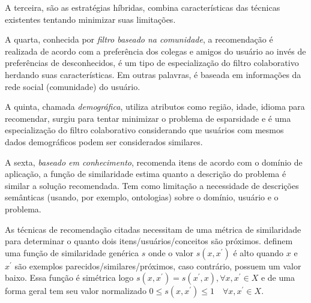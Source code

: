 A terceira, são as estratégias híbridas, combina características das técnicas existentes tentando minimizar suas limitações.

A quarta, conhecida por \emph{filtro baseado na comunidade}, a recomendação é realizada de acordo com a preferência dos colegas e amigos do usuário ao invés de preferências de desconhecidos, é um tipo de especialização do filtro colaborativo herdando suas características. Em outras palavras, é baseada em informações da rede social (comunidade) do usuário.

A quinta, chamada \emph{demográfica}, utiliza atributos como região, idade, idioma para recomendar, surgiu para tentar minimizar o problema de esparsidade e é uma especialização do filtro colaborativo considerando que usuários com mesmos dados demográficos podem ser considerados similares.

A sexta, \emph{baseado em conhecimento}, recomenda itens de acordo com o domínio de aplicação, a função de similaridade estima quanto a descrição do problema é similar a solução recomendada. Tem como limitação a necessidade de descrições semânticas (usando, por exemplo, ontologias) sobre o domínio, usuário e o problema.

As técnicas de recomendação citadas necessitam de uma métrica de similaridade para determinar o quanto dois itens/usuários/conceitos são próximos.  definem uma função de similaridade genérica \(s\) onde o valor \(s(x,x^{'})\) é alto quando \(x\) e \(x^{'}\) são exemplos parecidos/similares/próximos, caso contrário, possuem um valor baixo. Essa função é simétrica logo \(s(x,x^{'}) = s(x^{'},x), \forall x,x^{'} \in X\) e de uma forma geral tem seu valor normalizado \(0 \leq s(x,x^{'}) \leq 1 \quad \forall x,x^{'} \in X\).

